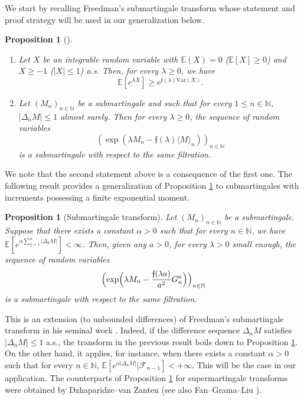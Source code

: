 \documentclass[10pt]{amsart}
\theoremstyle{plain}
\newtheorem{proposition}[theorem]{Proposition}
\theoremstyle{definition}
\newcommand\N{\mathbb{N}}
\begin{document}
We start by recalling Freedman's submartingale transform whose statement and proof strategy will be used in our generalization below.

\skpt
\begin{proposition}[{\cite[Cor.\,1.4(b), (3.7) \& (3.9)]{Freedman}}]\label{prop.freedman.submartingale}
\begin{enumerate}
\item
Let $X$ be an integrable random variable with $\mathbb{E}(X)=0$ (\resp $\mathbb{E}[X] \geq 0$) and $X\geq -1$ (\resp $|X| \leq 1$) a.s. Then, for every $\lambda \geq 0$, we have
\[
\mathbb{E}[e^{\lambda X}] \geq e^{\mathfrak{f}(\lambda) \mathrm{Var}(X)}.
\]
\item
Let $(M_n)_{n\in \N}$ be a submartingale and such that for every $1 \leq n \in \N$, $|\Delta_n M|\leq 1$ almost surely. Then for every $\lambda \geq 0$, the sequence of random variables
\[
\left(\exp\left(\lambda M_n - \mathfrak{f}(\lambda) \langle M\rangle_n\right)\right)_{n \in \N}
\]
is a submartingale with respect to the same filtration.
\end{enumerate}
\end{proposition}

We note that the second statement above is a consequence of the first one.
The following result provides a generalization of Proposition \ref{prop.freedman.submartingale} to submartingales with increments possessing a finite exponential moment.

\begin{proposition}[Submartingale transform]\label{prop.submart.trans}
Let $(M_n)_{n\in \N}$ be a submartingale. Suppose that there exists a constant $\alpha>0$ such that for every $n \in \N$, we have $\mathbb{E}[e^{\alpha \sum_{k=1}^n |\Delta_k M|}]<\infty$. Then, given any $a>0$, for every $\lambda >0$ small enough, the sequence of random variables
\[
\Bigl(\exp\Bigl(\lambda M_n - \frac{\mathfrak{f}(\lambda a)}{a^2}G_n^a\Bigr)\Bigr)_{n \in \N}
\]
is a submartingale with respect to the same filtration.
\end{proposition}

This is an extension (to unbounded differences) of Freedman's submartingale transform in his seminal work \cite{Freedman}. Indeed, if the difference sequence $\Delta_n M$ satisfies $|\Delta_n M| \leq 1$ a.s., the transform in the previous result boils down to Proposition \ref{prop.freedman.submartingale}. On the other hand, it applies, for instance, when there exists a constant $\alpha>0$ such that for every $n\in \N$, $\mathbb{E}[e^{\alpha |\Delta_n M|} | \mathcal{F}_{n-1}]<+\infty$.
This will be the case in our application.
The counterparts of Proposition \ref{prop.submart.trans} for supermartingale transforms were obtained by Dzhaparidze--van Zanten \cite{DZ} (see also Fan--Grama--Liu \cite{fan.grama.liu}).
\end{document}
